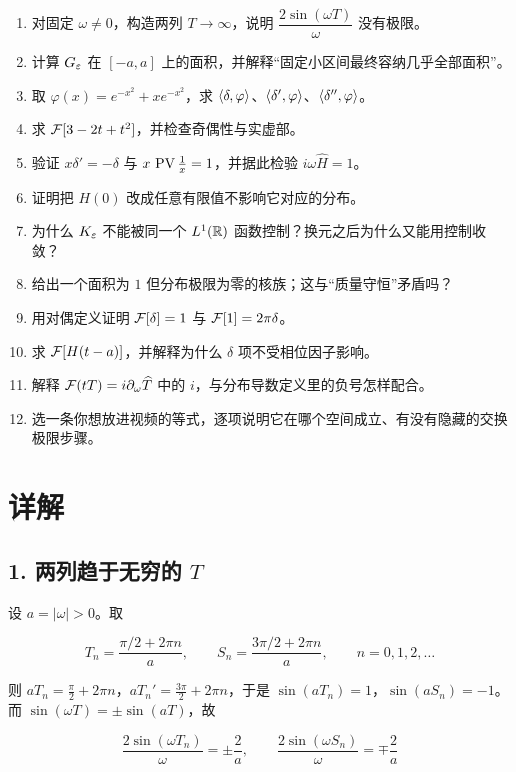 \begin{enumerate}[leftmargin=2em,itemsep=0.45em]
\item 对固定 $\omega\neq0$，构造两列 $T\to\infty$，说明 $\dfrac{2\sin(\omega T)}{\omega}$ 没有极限。
\item 计算 $G_\varepsilon$ 在 $[-a,a]$ 上的面积，并解释“固定小区间最终容纳几乎全部面积”。
\item 取 $\varphi(x)=e^{-x^{2}}+xe^{-x^{2}}$，求 $\langle \delta,\varphi\rangle$、$\langle \delta',\varphi\rangle$、$\langle \delta'',\varphi\rangle$。
\item 求 $\mathcal{F}[3-2t+t^{2}]$，并检查奇偶性与实虚部。
\item 验证 $x\delta'=-\delta$ 与 $x\,\operatorname{PV}\frac1x=1$，并据此检验 $i\omega\widehat H=1$。
\item 证明把 $H(0)$ 改成任意有限值不影响它对应的分布。
\item 为什么 $K_\varepsilon$ 不能被同一个 $L^1(\mathbb{R})$ 函数控制？换元之后为什么又能用控制收敛？
\item 给出一个面积为 $1$ 但分布极限为零的核族；这与“质量守恒”矛盾吗？
\item 用对偶定义证明 $\mathcal{F}[\delta]=1$ 与 $\mathcal{F}[1]=2\pi\delta$。
\item 求 $\mathcal{F}[H(t-a)]$，并解释为什么 $\delta$ 项不受相位因子影响。
\item 解释 $\mathcal{F}(tT)=i\partial_\omega\widehat T$ 中的 $i$，与分布导数定义里的负号怎样配合。
\item 选一条你想放进视频的等式，逐项说明它在哪个空间成立、有没有隐藏的交换极限步骤。
\end{enumerate}

\section{详解}

\subsection*{1. 两列趋于无穷的 $T$}

设 $a=|\omega|>0$。取

\begin{equation}
T_n=\frac{\pi/2+2\pi n}{a},
\qquad
S_n=\frac{3\pi/2+2\pi n}{a},
\qquad n=0,1,2,\dots
\end{equation}

则 $aT_n=\frac{\pi}{2}+2\pi n$，$aT_n'=\frac{3\pi}{2}+2\pi n$，于是 $\sin(aT_n)=1$，$\sin(aS_n)=-1$。而 $\sin(\omega T)=\pm\sin(aT)$，故

\begin{equation}
\frac{2\sin(\omega T_n)}{\omega}=\pm\frac{2}{a},
\qquad
\frac{2\sin(\omega S_n)}{\omega}=\mp\frac{2}{a}
\end{equation}

